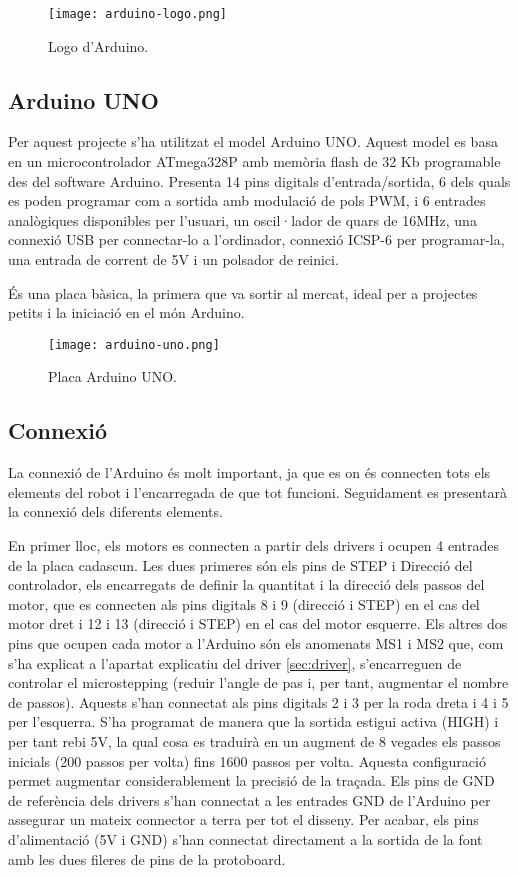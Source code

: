 \begin{figure}[H]
	\centering
	\texttt{[image: arduino-logo.png]}
	\caption{Logo d'Arduino.}
	\label{fig:arduinologo}
\end{figure}

\subsection{Arduino UNO}

Per aquest projecte s’ha utilitzat el model Arduino UNO. Aquest model  es basa en un microcontrolador ATmega328P amb memòria flash de 32 Kb programable des del software Arduino. Presenta 14 pins digitals d’entrada/sortida, 6 dels quals es poden programar com a sortida amb modulació de pols PWM, i 6 entrades analògiques disponibles per l’usuari, un oscil·lador de quars de 16MHz, una connexió USB per connectar-lo a l’ordinador, connexió ICSP-6 per programar-la, una entrada de corrent de 5V i un polsador de reinici. 

És una placa bàsica, la primera que va sortir al mercat, ideal per a projectes petits i la iniciació en el món Arduino.

\begin{figure}[H]
	\centering
	\texttt{[image: arduino-uno.png]}
	\caption{Placa Arduino UNO.}
	\label{fig:arduinouno}
\end{figure}

\subsection{Connexió}\label{sec:connexio}

La connexió de l’Arduino és molt important, ja que es on és connecten tots els elements del robot i l’encarregada de que tot funcioni. Seguidament es presentarà la connexió dels diferents elements.

En primer lloc, els motors es connecten a partir dels drivers i ocupen 4 entrades de la placa cadascun. Les dues primeres són els pins de STEP i Direcció del controlador, els encarregats de definir la quantitat i la direcció dels passos del motor, que es connecten als pins digitals 8 i 9 (direcció i STEP) en el cas del motor dret i 12 i 13 (direcció i STEP) en el cas del motor esquerre. Els altres dos pins que ocupen cada motor a l’Arduino són els anomenats MS1 i MS2 que, com s’ha explicat a l’apartat explicatiu del driver \ref{sec:driver}, s’encarreguen de controlar el microstepping (reduir l’angle de pas i, per tant, augmentar el nombre de passos). Aquests s’han connectat als pins digitals 2 i 3 per la roda dreta i 4 i 5 per l’esquerra. S’ha programat de manera que la sortida estigui activa (HIGH) i per tant rebi 5V, la qual cosa es traduirà en un augment de 8 vegades els passos inicials (200 passos per volta) fins 1600 passos per volta. Aquesta configuració permet augmentar considerablement la precisió de la traçada. Els pins de GND de referència dels drivers s’han connectat a les entrades GND de l’Arduino per assegurar un mateix connector a terra per tot el disseny. Per acabar, els pins d’alimentació (5V i GND) s’han connectat directament a la sortida de la font amb les dues fileres de pins de la protoboard. 

